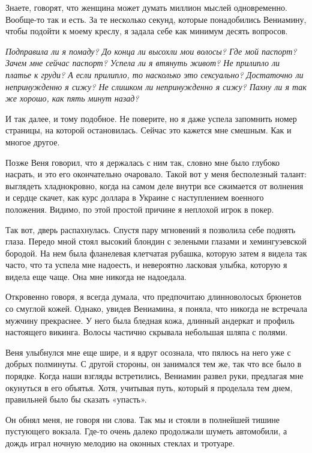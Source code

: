 \documentclass[
]{book}
\begin{document}
Знаете, говорят, что женщина может думать миллион мыслей одновременно. Вообще-то так и есть. За те несколько секунд, которые понадобились Вениамину, чтобы подойти к моему креслу, я задала себе как минимум десять вопросов.

\emph{Подправила ли я помаду? До конца ли высохли мои волосы? Где мой паспорт? Зачем мне сейчас паспорт? Успела ли я втянуть живот? Не прилипло ли платье к груди? А если прилипло, то насколько это сексуально? Достаточно ли непринужденно я сижу? Не слишком ли непринужденно я сижу? Пахну ли я так же хорошо, как пять минут назад?}

И так далее, и тому подобное. Не поверите, но я даже успела запомнить номер страницы, на которой остановилась. Сейчас это кажется мне смешным. Как и многое другое.

Позже Веня говорил, что я держалась с ним так, словно мне было глубоко насрать, и это его окончательно очаровало. Такой вот у меня бесполезный талант: выглядеть хладнокровно, когда на самом деле внутри все сжимается от волнения и сердце скачет, как курс доллара в Украине с наступлением военного положения. Видимо, по этой простой причине я неплохой игрок в покер.

Так вот, дверь распахнулась. Спустя пару мгновений я позволила себе поднять глаза. Передо мной стоял высокий блондин с зелеными глазами и хемингуэевской бородой. На нем была фланелевая клетчатая рубашка, которую затем я видела так часто, что та успела мне надоесть, и невероятно ласковая улыбка, которую я видела еще чаще. Она мне никогда не надоедала.

Откровенно говоря, я всегда думала, что предпочитаю длинноволосых брюнетов со смуглой кожей. Однако, увидев Вениамина, я поняла, что никогда не встречала мужчину прекраснее. У него была бледная кожа, длинный андеркат и профиль настоящего викинга. Волосы частично скрывала небольшая шляпа с полями.

Веня улыбнулся мне еще шире, и я вдруг осознала, что пялюсь на него уже с добрых полминуты. С другой стороны, он занимался тем же, так что все было в порядке. Когда наши взгляды встретились, Вениамин развел руки, предлагая мне окунуться в его объятья. Хотя, учитывая путь, который я проделала тем днем, правильней было бы сказать «упасть».

Он обнял меня, не говоря ни слова. Так мы и стояли в полнейшей тишине пустующего вокзала. Где-то очень далеко продолжали шуметь автомобили, а дождь играл ночную мелодию на оконных стеклах и тротуаре.
\end{document}
